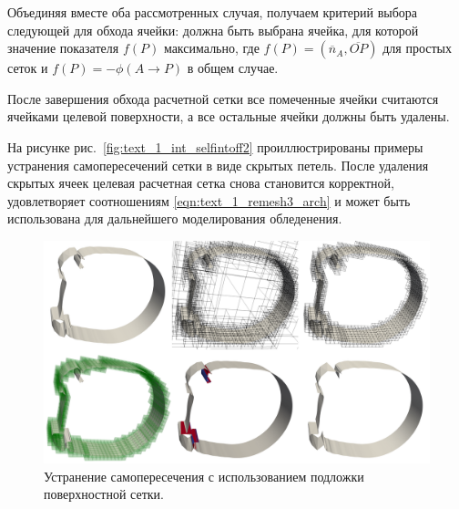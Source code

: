 Объединяя вместе оба рассмотренных случая, получаем критерий выбора следующей для обхода ячейки: должна быть выбрана ячейка, для которой значение показателя $f(P)$ максимально, где $f(P) = (\overline{n}_A, \overline{OP})$ для простых сеток и $f(P) = -\phi(A \rightarrow P)$ в общем случае.

После завершения обхода расчетной сетки все помеченные ячейки считаются ячейками целевой поверхности, а все остальные ячейки должны быть удалены.

На рисунке рис.~\ref{fig:text_1_int_selfintoff2} проиллюстрированы примеры устранения самопересечений сетки в виде скрытых петель.
После удаления скрытых ячеек целевая расчетная сетка снова становится корректной, удовлетворяет соотношениям \eqref{eqn:text_1_remesh3_arch} и может быть использована для дальнейшего моделирования обледенения.

\begin{figure}[!ht]
\centering
\includegraphics[width=1.0\textwidth]{fig/int_wing_all.png}
\singlespacing
\caption{Устранение самопересечения с использованием подложки поверхностной сетки.}
\label{fig:text_1_int_2}
\end{figure}

